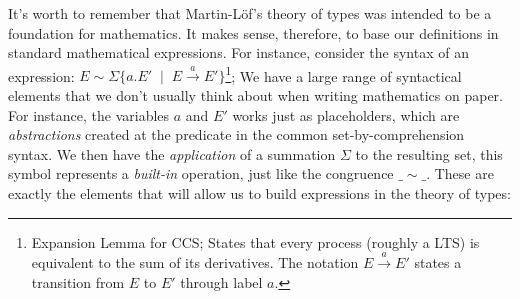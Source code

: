 It's worth to remember that Martin-L\"{o}f's theory of types was intended to be a foundation
for mathematics. It makes sense, therefore, to base our definitions in standard mathematical expressions.
For instance, consider the syntax of an expression: $E \sim \Sigma \{ a.E' \;\mid\; E \xrightarrow{\;a\;} E' \}$\footnote{%
Expansion Lemma for CCS; States that every process (roughly a LTS) is equivalent to the sum of its derivatives.
The notation $E \xrightarrow{\;a\;} E'$ states a transition from $E$ to $E'$ through label $a$.
}; We have a large range of syntactical elements that we don't usually think about when writing
mathematics on paper. For instance, the variables $a$ and $E'$ works just as placeholders, which
are \emph{abstractions} created at the predicate in the common set-by-comprehension syntax. We then
have the \emph{application} of a summation $\Sigma$ to the resulting set, this symbol represents
a \emph{built-in} operation, just like the congruence $\_\sim\_$. These are exactly the elements
that will allow us to build expressions in the theory of types:\\

